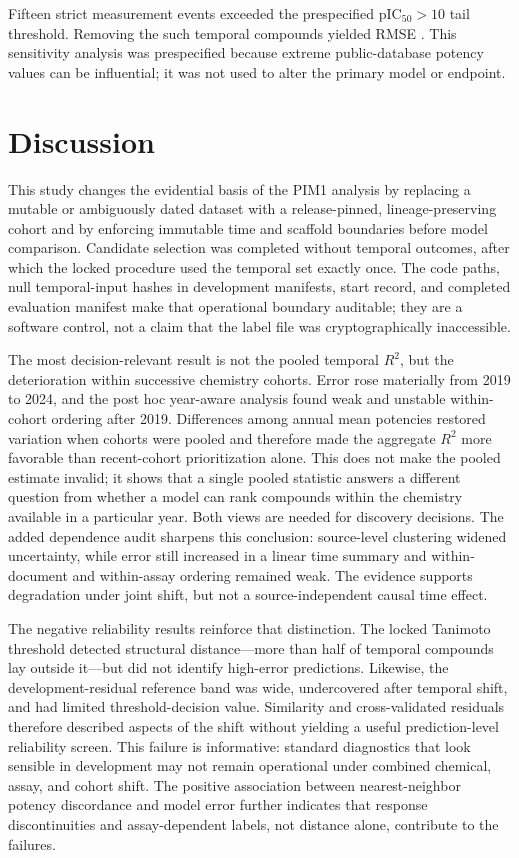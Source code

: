 \documentclass[11pt]{article}
\begin{document}
Fifteen strict measurement events exceeded the prespecified pIC$_{50}>10$ tail
threshold. Removing the \TemporalHighTailRemoved{} such temporal compounds
yielded RMSE \NoHighTailTemporalRMSE{}. This sensitivity analysis was
prespecified because extreme public-database potency values can be influential;
it was not used to alter the primary model or endpoint.

\section{Discussion}

This study changes the evidential basis of the PIM1 analysis by replacing a
mutable or ambiguously dated dataset with a release-pinned, lineage-preserving
cohort and by enforcing immutable time and scaffold boundaries before model
comparison. Candidate selection was completed without temporal outcomes, after
which the locked procedure used the temporal set exactly once. The code paths,
null temporal-input hashes in development manifests, start record, and completed
evaluation manifest make that operational boundary auditable; they are a software
control, not a claim that the label file was cryptographically inaccessible.

The most decision-relevant result is not the pooled temporal $R^2$, but the
deterioration within successive chemistry cohorts. Error rose materially from
2019 to 2024, and the post hoc year-aware analysis found weak and unstable
within-cohort ordering after 2019. Differences among annual mean potencies
restored variation when cohorts were pooled and therefore made the aggregate
$R^2$ more favorable than recent-cohort prioritization alone. This does not make
the pooled estimate invalid; it shows that a single pooled statistic answers a
different question from whether a model can rank compounds within the chemistry
available in a particular year. Both views are needed for discovery decisions.
The added dependence audit sharpens this conclusion: source-level clustering
widened uncertainty, while error still increased in a linear time summary and
within-document and within-assay ordering remained weak. The evidence supports
degradation under joint shift, but not a source-independent causal time effect.

The negative reliability results reinforce that distinction. The locked
Tanimoto threshold detected structural distance---more than half of temporal
compounds lay outside it---but did not identify high-error predictions. Likewise,
the development-residual reference band was wide, undercovered after temporal
shift, and had limited threshold-decision value. Similarity and cross-validated
residuals therefore described aspects of the shift without yielding a useful
prediction-level reliability screen. This failure is informative: standard diagnostics that
look sensible in development may not remain operational under combined chemical,
assay, and cohort shift.
The positive association between nearest-neighbor potency discordance and model
error further indicates that response discontinuities and assay-dependent labels,
not distance alone, contribute to the failures.
\end{document}

